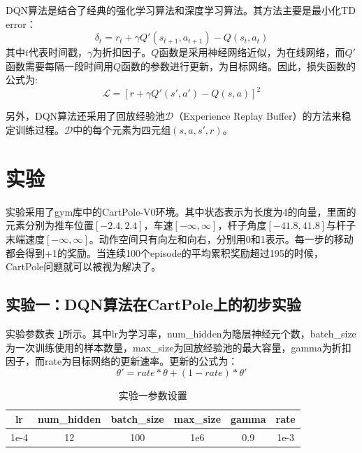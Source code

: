 \documentclass{article}
\begin{document}
        DQN算法是结合了经典的强化学习算法和深度学习算法。其方法主要是最小化TD error：
        \begin{equation}
            \delta_t = r_t+\gamma Q'(s_{t+1}, a_{t+1})-Q(s_t,a_t)
        \end{equation}
        其中$t$代表时间戳，$\gamma$为折扣因子。$Q$函数是采用神经网络近似，为在线网络，而$Q'$函数需要每隔一段时间用$Q$函数的参数进行更新，为目标网络。因此，损失函数的公式为:
        \begin{equation}
            \mathcal{L}=[r+\gamma Q'(s',a')-Q(s,a)]^2
        \end{equation}
        
        另外，DQN算法还采用了回放经验池$\mathcal{D}$（Experience Replay Buffer）的方法来稳定训练过程。$\mathcal{D}$中的每个元素为四元组$(s,a,s',r)$。
    \section{实验}
        实验采用了gym库中的CartPole-V0环境。其中状态表示为长度为4的向量，里面的元素分别为推车位置$[-2.4, 2.4]$，车速$[-\infty, \infty]$，杆子角度$[-41.8, 41.8]$与杆子末端速度$[-\infty, \infty]$。动作空间只有向左和向右，分别用0和1表示。每一步的移动都会得到+1的奖励。当连续100个episode的平均累积奖励超过195的时候，CartPole问题就可以被视为解决了。

        \subsection{实验一：DQN算法在CartPole上的初步实验}
        实验参数表 \ref{table:parameter1}所示。其中lr为学习率，num\_hidden为隐层神经元个数，batch\_size为一次训练使用的样本数量，max\_size为回放经验池的最大容量，gamma为折扣因子，而rate为目标网络的更新速率。更新的公式为：
        \begin{equation}
            \theta' = rate * \theta + (1-rate) * \theta'
        \end{equation}
        \begin{table}[h]
            \centering
            \begin{tabular}{c|c|c|c|c|c}
                \hline
                lr & num\_hidden & batch\_size & max\_size & gamma & rate\\
                \hline
                1e-4 & 12 & 100 & 1e6 & 0.9 & 1e-3\\
                \hline
            \end{tabular}
            \caption{实验一参数设置}
            \label{table:parameter1}
        \end{table}
\end{document}
